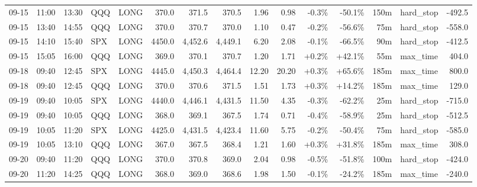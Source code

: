 \documentclass[11pt,a4paper,twoside]{article}
\begin{document}
\begin{landscape}
\begin{center}
\begin{longtable}{>{\color{txtmain}}l l l l l r r r r r r r r >{\color{txtmain}}l r}
09-15 & 11:00 & 13:30 & QQQ & LONG & 370.0 & 371.5 & 370.5 & 1.96 & 0.98 & \textcolor{lossred}{-0.3\%} & \textcolor{lossred}{-50.1\%} & 150m & hard\_stop & \textcolor{lossred}{-492.5} \\
09-15 & 13:40 & 14:55 & QQQ & LONG & 370.0 & 370.7 & 370.0 & 1.10 & 0.47 & \textcolor{lossred}{-0.2\%} & \textcolor{lossred}{-56.6\%} & 75m & hard\_stop & \textcolor{lossred}{-558.0} \\
09-15 & 14:10 & 15:40 & SPX & LONG & 4450.0 & 4,452.6 & 4,449.1 & 6.20 & 2.08 & \textcolor{lossred}{-0.1\%} & \textcolor{lossred}{-66.5\%} & 90m & hard\_stop & \textcolor{lossred}{-412.5} \\
09-15 & 15:05 & 16:00 & QQQ & LONG & 369.0 & 370.1 & 370.7 & 1.20 & 1.71 & \textcolor{wingreen}{+0.2\%} & \textcolor{wingreen}{+42.1\%} & 55m & max\_time & \textcolor{wingreen}{404.0} \\
09-18 & 09:40 & 12:45 & SPX & LONG & 4445.0 & 4,450.3 & 4,464.4 & 12.20 & 20.20 & \textcolor{wingreen}{+0.3\%} & \textcolor{wingreen}{+65.6\%} & 185m & max\_time & \textcolor{wingreen}{800.0} \\
09-18 & 09:40 & 12:45 & QQQ & LONG & 370.0 & 370.6 & 371.5 & 1.51 & 1.73 & \textcolor{wingreen}{+0.3\%} & \textcolor{wingreen}{+14.2\%} & 185m & max\_time & \textcolor{wingreen}{129.0} \\
09-19 & 09:40 & 10:05 & SPX & LONG & 4440.0 & 4,446.1 & 4,431.5 & 11.50 & 4.35 & \textcolor{lossred}{-0.3\%} & \textcolor{lossred}{-62.2\%} & 25m & hard\_stop & \textcolor{lossred}{-715.0} \\
09-19 & 09:40 & 10:05 & QQQ & LONG & 368.0 & 369.1 & 367.5 & 1.74 & 0.71 & \textcolor{lossred}{-0.4\%} & \textcolor{lossred}{-58.9\%} & 25m & hard\_stop & \textcolor{lossred}{-512.5} \\
09-19 & 10:05 & 11:20 & SPX & LONG & 4425.0 & 4,431.5 & 4,423.4 & 11.60 & 5.75 & \textcolor{lossred}{-0.2\%} & \textcolor{lossred}{-50.4\%} & 75m & hard\_stop & \textcolor{lossred}{-585.0} \\
09-19 & 10:05 & 13:10 & QQQ & LONG & 367.0 & 367.5 & 368.4 & 1.21 & 1.60 & \textcolor{wingreen}{+0.3\%} & \textcolor{wingreen}{+31.8\%} & 185m & max\_time & \textcolor{wingreen}{308.0} \\
09-20 & 09:40 & 11:20 & QQQ & LONG & 370.0 & 370.8 & 369.0 & 2.04 & 0.98 & \textcolor{lossred}{-0.5\%} & \textcolor{lossred}{-51.8\%} & 100m & hard\_stop & \textcolor{lossred}{-424.0} \\
09-20 & 11:20 & 14:25 & QQQ & LONG & 368.0 & 369.0 & 368.6 & 1.98 & 1.50 & \textcolor{lossred}{-0.1\%} & \textcolor{lossred}{-24.2\%} & 185m & max\_time & \textcolor{lossred}{-240.0} \\

\end{longtable}
\end{center}
\end{landscape}
\end{document}
